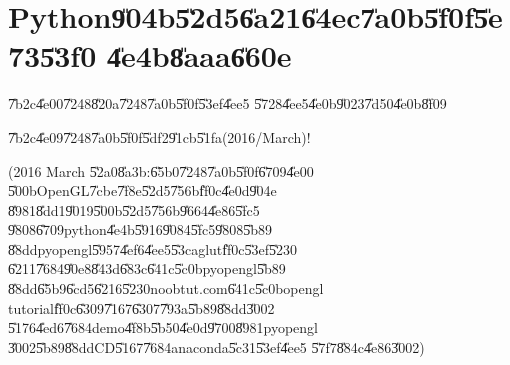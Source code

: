                       

\part{Python\U{904b}\U{52d5}\U{6a21}\U{64ec}\U{7a0b}\U{5f0f}\U{5e73}\U{53f0}%
\U{4e4b}\U{8aaa}\U{660e}}

\setcounter{page}{1}

\bigskip

\U{7b2c}\U{4e00}\U{7248}\U{820a}\U{7248}\U{7a0b}\U{5f0f}\U{53ef}\U{4ee5}%
\U{5728}\U{4ee5}\U{4e0b}\U{9023}\U{7d50}\U{4e0b}\U{8f09}

\href{https://github.com/whymranderson/cordtrans/tree/test_1_github}{%
\underline{\color{blue}%
}}

\U{7b2c}\U{4e09}\U{7248}\U{7a0b}\U{5f0f}\U{5df2}\U{91cb}\U{51fa}(2016/March)!

\href{https://github.com/whymranderson/cordtrans/tree/GS_version_3}{%
\underline{\color{blue}%
}}

\bigskip

(2016 March \U{52a0}\U{8a3b}:\U{65b0}\U{7248}\U{7a0b}\U{5f0f}\U{6709}\U{4e00}%
\U{500b}OpenGL\U{7cbe}\U{7f8e}\U{52d5}\U{756b}\U{ff0c}\U{4e0d}\U{904e}%
\U{8981}\U{8dd1}\U{9019}\U{500b}\U{52d5}\U{756b}\U{9664}\U{4e86}\U{5fc5}%
\U{9808}\U{6709}python\U{4e4b}\U{5916}\U{9084}\U{5fc5}\U{9808}\U{5b89}%
\U{88dd}pyopengl\U{5957}\U{4ef6}\U{4ee5}\U{53ca}glut\U{ff0c}\U{53ef}\U{5230}%
\U{6211}\U{7684}\U{90e8}\U{843d}\U{683c}\U{641c}\U{5c0b}pyopengl\U{5b89}%
\U{88dd}\U{65b9}\U{6cd5}\U{6216}\U{5230}noobtut.com\U{641c}\U{5c0b}opengl
tutorial\U{ff0c}\U{6309}\U{7167}\U{6307}\U{793a}\U{5b89}\U{88dd}\U{3002}%
\U{5176}\U{4ed6}\U{7684}demo\U{4f8b}\U{5b50}\U{4e0d}\U{9700}\U{8981}pyopengl%
\U{3002}\U{5b89}\U{88dd}CD\U{5167}\U{7684}anaconda\U{5c31}\U{53ef}\U{4ee5}%
\U{57f7}\U{884c}\U{4e86}\U{3002})

\bigskip

